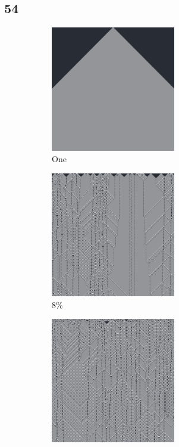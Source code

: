 \documentclass[12pt, fleqn]{report}                             %
\theoremstyle{break}                                            %
\begin{document}
            
      \subsection{54}
      \begin{figure}[ht!]
        \centering
        \begin{subfigure}[b]{0.4\linewidth}
          \includegraphics[width=0.6\textwidth]{Images/54/a.png}
          \caption{One}
        \end{subfigure}
        \begin{subfigure}[b]{0.4\linewidth}
          \includegraphics[width=0.6\textwidth]{Images/54/b.png}
          \caption{8\%}
        \end{subfigure}
        \begin{subfigure}[b]{0.4\linewidth}
          \includegraphics[width=0.6\textwidth]{Images/54/c.png}

\end{subfigure}
\end{figure}
\end{document}
